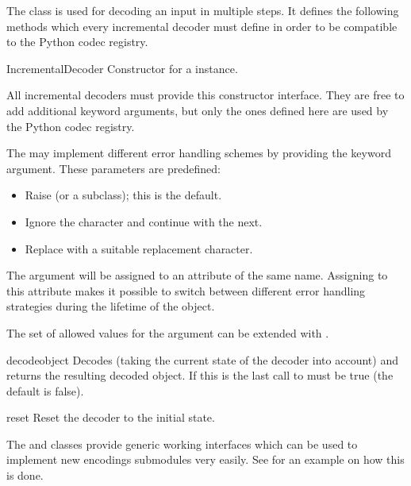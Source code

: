 The  class is used for decoding an input in multiple
steps. It defines the following methods which every incremental decoder must
define in order to be compatible to the Python codec registry.

\begin{classdesc}{IncrementalDecoder}{}
  Constructor for a  instance.

  All incremental decoders must provide this constructor interface. They are
  free to add additional keyword arguments, but only the ones defined
  here are used by the Python codec registry.

  The  may implement different error handling
  schemes by providing the  keyword argument. These
  parameters are predefined:

  \begin{itemize}
    \item {} Raise  (or a subclass);
                          this is the default.
    \item {} Ignore the character and continue with the next.
    \item {} Replace with a suitable replacement character.
  \end{itemize}

  The  argument will be assigned to an attribute of the
  same name. Assigning to this attribute makes it possible to switch
  between different error handling strategies during the lifetime
  of the  object.

  The set of allowed values for the  argument can
  be extended with .
\end{classdesc}

\begin{methoddesc}{decode}{object}
  Decodes  (taking the current state of the decoder into account)
  and returns the resulting decoded object. If this is the last call to
    must be true (the default is false).
\end{methoddesc}

\begin{methoddesc}{reset}{}
  Reset the decoder to the initial state.
\end{methoddesc}


The  and  classes provide
generic working interfaces which can be used to implement new
encodings submodules very easily. See  for an
example on how this is done.


